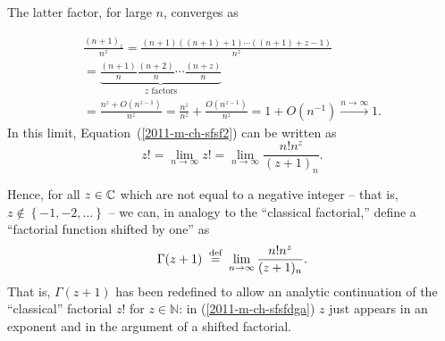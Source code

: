 The latter factor, for large $n$, converges as

\begin{equation}
\begin{split}
\frac{( n +1)_ z  }{  n ^ z }   =
\frac{( n +1)(( n +1)+1)\cdots (( n +1)+ z -1)}{  n ^ z }  \\
=
\underbrace{\frac{( n +1)}{n}
\frac{( n +2)}{n}
\cdots
\frac{( n +z)}{n}}_{z \text{ factors}}
  \\
=
\frac{ n ^ z  +O( n ^{ z -1})}{  n ^ z }
=
\frac{ n ^ z }{  n ^ z }  +
\frac{O( n ^{ z -1})}{ n ^ z }
=
1  + O( n ^{-1})
\stackrel{ n  \rightarrow \infty}{\longrightarrow} 1.
\end{split}
\end{equation}
In this limit, Equation~(\ref{2011-m-ch-sfsf2})  can be written as
\begin{equation}
 z !
= \lim_{ n \rightarrow \infty}  z !
=  \lim_{ n \rightarrow \infty} \frac{ n !  n ^ z  }{  ( z +1)_ n }
.
\label{2011-m-ch-sfsf3}
\end{equation}

Hence, for all $z\in {\Bbb C}$ which are not equal to a negative integer
--
that is,  $z \not\in\left\{-1,-2,\ldots\right\}$
--
we can, in analogy to the ``classical factorial,''
define   a ``factorial function shifted by one'' as
\begin{equation}
\Gamma ( z + 1)
\stackrel{{\tiny \textrm{ def }}}{=} \lim_{ n \rightarrow \infty} \frac{ n !  n ^ z  }{  ( z +1)_ n }.
\label{2011-m-ch-sfsfdga}
\end{equation}
That is,
$\Gamma (z+1)$ has been redefined to
allow  an analytic continuation of the ``classical'' factorial $z!$ for $z \in \mathbb{N}$:
in (\ref{2011-m-ch-sfsfdga}) $z$ just appears in an exponent and in the argument of a shifted factorial.

